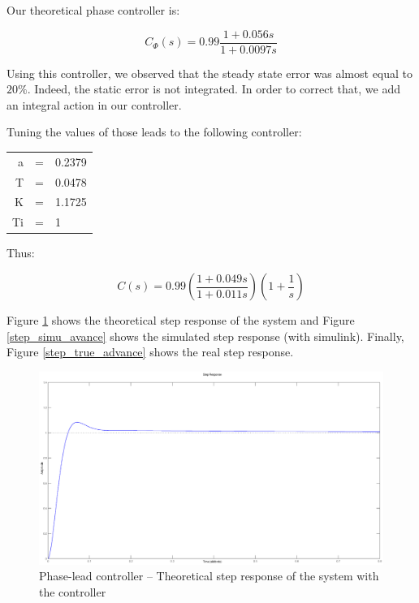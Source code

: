 Our theoretical phase controller is:

$$C_{\Phi}(s) = 0.99 \frac{1 + 0.056s}{1 + 0.0097s} $$

Using this controller, we observed that the steady state error was almost equal to $20\%$. Indeed, the static error is not integrated. In order to correct that, we add an integral action in our controller.

Tuning the values of those leads to the following controller:

\begin{center}
 \begin{tabular}{rcl}
 a & = &0.2379 \\
 T & = &  0.0478 \\
K & = & 1.1725 \\
Ti & = & 1 \\
\end{tabular}
\end{center}

Thus:

$$C(s) = 0.99 \left(\frac{1 + 0.049s}{1+0.011s}\right)\left(1+\frac{1}{s}\right)$$


Figure \ref{step_avance} shows the theoretical step response of the system and Figure \ref{step_simu_avance} shows the simulated step response (with simulink). Finally, Figure \ref{step_true_advance} shows the real step response.

\begin{center}
 \begin{figure}[ht]
 \includegraphics[width=\linewidth]{fig/step_avance.eps}
 \caption{Phase-lead controller -- Theoretical step response of the system with the controller}
 \label{step_avance}
 \end{figure}
\end{center}

